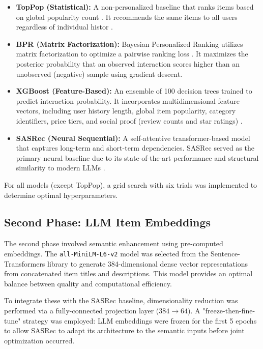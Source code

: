 \documentclass[conference]{IEEEtran}
\begin{document}
\begin{itemize}
    \item \textbf{TopPop (Statistical):} A non-personalized baseline that ranks items based on global popularity count \cite{b17}. It recommends the same items to all users regardless of individual histor \cite{b19}.
    \item \textbf{BPR (Matrix Factorization):} Bayesian Personalized Ranking utilizes matrix factorization to optimize a pairwise ranking loss \cite{b1,b17}. It maximizes the posterior probability that an observed interaction scores higher than an unobserved (negative) sample using gradient descent.
    \item \textbf{XGBoost (Feature-Based):} An ensemble of 100 decision trees trained to predict interaction probability. It incorporates multidimensional feature vectors, including user history length, global item popularity, category identifiers, price tiers, and social proof (review counts and star ratings) \cite{b16,b17}.
    \item \textbf{SASRec (Neural Sequential):} A self-attentive transformer-based model that captures long-term and short-term dependencies. SASRec served as the primary neural baseline due to its state-of-the-art performance and structural similarity to modern LLMs \cite{b1,b13,b14}.
\end{itemize}

For all models (except TopPop), a grid search with six trials was implemented to determine optimal hyperparameters.

\subsection{Second Phase: LLM Item Embeddings}

The second phase involved semantic enhancement using pre-computed embeddings. The \texttt{all-MiniLM-L6-v2} model was selected from the Sentence-Transformers library to generate 384-dimensional dense vector representations from concatenated item titles and descriptions. This model provides an optimal balance between quality and computational efficiency.

To integrate these with the SASRec baseline, dimensionality reduction was performed via a fully-connected projection layer ($384 \to 64$). A "freeze-then-fine-tune" strategy was employed: LLM embeddings were frozen for the first 5 epochs to allow SASRec to adapt its architecture to the semantic inputs before joint optimization occurred.
\end{document}
